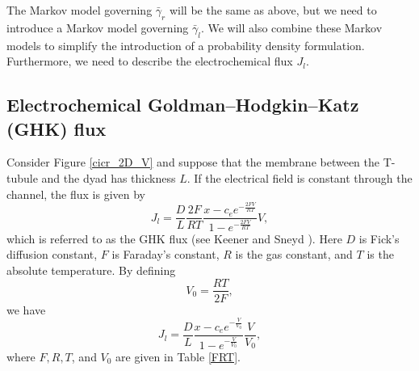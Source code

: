 The Markov model governing $\bar{\gamma}_{r}$ will be the same as above, but we need to
introduce a Markov model governing $\bar{\gamma}_{l}$. We will also combine these Markov models
to simplify the introduction of a probability density formulation. Furthermore, we need to describe the electrochemical flux $J_{l}$.

\subsection{Electrochemical Goldman--Hodgkin--Katz (GHK) flux}

Consider Figure \ref{cicr_2D_V} and suppose that the membrane between the
T-tubule and the dyad has thickness $L.$ If the electrical field is
constant through the channel, the flux is given by
\begin{equation}
J_{l}=\frac{D}{L}\frac{2F}{RT}\frac{x-c_{e}e^{-\frac{2FV}{RT}}}{1-e^{-\frac
{2FV}{RT}}}V, \label{GHK}
\end{equation}
which is referred to as the GHK flux (see Keener and Sneyd \cite{KeenerSneyd}). Here $D$ is
Fick's diffusion constant, $F$ is Faraday's constant, $R$ is the gas constant,
and $T$ is the absolute temperature.
By defining
\[
V_0=\frac{RT}{2F},
\]
we have
\begin{equation}
J_{l}=\frac{D}{L}\frac{x-c_{e}e^{-\frac{V}{V_0}}}{1-e^{-\frac{V}{V_0}}}\frac{V}{V_0},\label{fluxJ}
\end{equation}
where $F,R,T$, and $V_0$ are given in Table \ref{FRT}.


